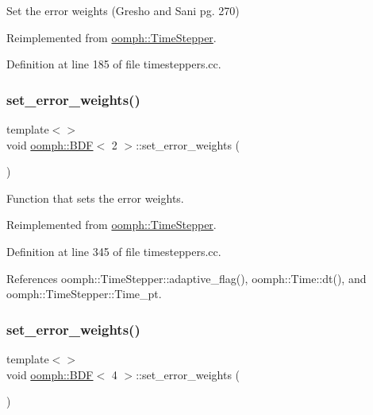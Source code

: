Set the error weights (Gresho and Sani pg. 270) 



Reimplemented from \hyperlink{classoomph_1_1TimeStepper_aee0c1da870a603e64efebb51dfc96a3d}{oomph\+::\+Time\+Stepper}.



Definition at line 185 of file timesteppers.\+cc.

\mbox{\label{classoomph_1_1BDF_afef7f18c1227c5c96910331ab2b987e6}} 
\subsubsection{\texorpdfstring{set\+\_\+error\+\_\+weights()}{set\_error\_weights()}\hspace{0.1cm}{\footnotesize\ttfamily [2/4]}}
{\footnotesize\ttfamily template$<$$>$ \\
void \hyperlink{classoomph_1_1BDF}{oomph\+::\+B\+DF}$<$ 2 $>$\+::set\+\_\+error\+\_\+weights (\begin{DoxyParamCaption}{ }\end{DoxyParamCaption})\hspace{0.3cm}{\ttfamily [virtual]}}



Function that sets the error weights. 



Reimplemented from \hyperlink{classoomph_1_1TimeStepper_aee0c1da870a603e64efebb51dfc96a3d}{oomph\+::\+Time\+Stepper}.



Definition at line 345 of file timesteppers.\+cc.



References oomph\+::\+Time\+Stepper\+::adaptive\+\_\+flag(), oomph\+::\+Time\+::dt(), and oomph\+::\+Time\+Stepper\+::\+Time\+\_\+pt.

\mbox{\label{classoomph_1_1BDF_a2de533281fb6905f22217500e5c03dad}} 
\subsubsection{\texorpdfstring{set\+\_\+error\+\_\+weights()}{set\_error\_weights()}\hspace{0.1cm}{\footnotesize\ttfamily [3/4]}}
{\footnotesize\ttfamily template$<$$>$ \\
void \hyperlink{classoomph_1_1BDF}{oomph\+::\+B\+DF}$<$ 4 $>$\+::set\+\_\+error\+\_\+weights (\begin{DoxyParamCaption}{ }\end{DoxyParamCaption})\hspace{0.3cm}{\ttfamily [virtual]}}




